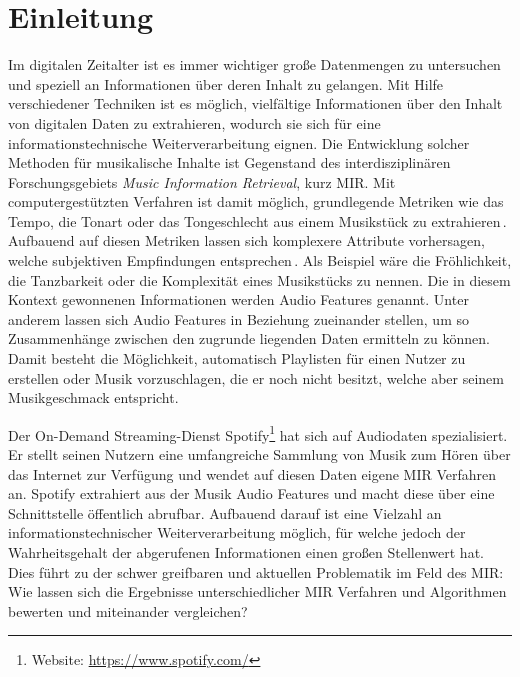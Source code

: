 \section*{Einleitung}
\label{sec:Einleitung}

Im digitalen Zeitalter ist es immer wichtiger große Datenmengen zu untersuchen und speziell an Informationen über deren Inhalt zu gelangen.
Mit Hilfe verschiedener Techniken ist es möglich, vielfältige Informationen über den Inhalt von digitalen Daten zu extrahieren, wodurch sie sich für eine informationstechnische Weiterverarbeitung eignen.
Die Entwicklung solcher Methoden für musikalische Inhalte ist Gegenstand des interdisziplinären Forschungsgebiets \textit{Music Information Retrieval}, kurz MIR.
Mit computergestützten Verfahren ist damit möglich, grundlegende Metriken wie das Tempo, die Tonart oder das Tongeschlecht aus einem Musikstück zu extrahieren\,\cite{Casey2008}.
Aufbauend auf diesen Metriken lassen sich komplexere Attribute vorhersagen, welche subjektiven Empfindungen entsprechen\,\cite{Sturm2013}.
Als Beispiel wäre die Fröhlichkeit, die Tanzbarkeit oder die Komplexität eines Musikstücks zu nennen.
Die in diesem Kontext gewonnenen Informationen werden Audio Features genannt.
Unter anderem lassen sich Audio Features in Beziehung zueinander stellen, um so Zusammenhänge zwischen den zugrunde liegenden Daten ermitteln zu können.
Damit besteht die Möglichkeit, automatisch Playlisten für einen Nutzer zu erstellen oder Musik vorzuschlagen, die er noch nicht besitzt, welche aber seinem Musikgeschmack entspricht.

Der On-Demand Streaming-Dienst Spotify\footnote{Website: \url{https://www.spotify.com/}} hat sich auf Audiodaten spezialisiert.
Er stellt seinen Nutzern eine umfangreiche Sammlung von Musik zum Hören über das Internet zur Verfügung und wendet auf diesen Daten eigene MIR Verfahren an.
Spotify extrahiert aus der Musik Audio Features und macht diese über eine Schnittstelle öffentlich abrufbar.
Aufbauend darauf ist eine Vielzahl an informationstechnischer Weiterverarbeitung möglich, für welche jedoch der Wahrheitsgehalt der abgerufenen Informationen einen großen Stellenwert hat.
Dies führt zu der schwer greifbaren und aktuellen Problematik im Feld des MIR:
Wie lassen sich die Ergebnisse unterschiedlicher MIR Verfahren und Algorithmen bewerten und miteinander vergleichen? \cite{Downie2004}

